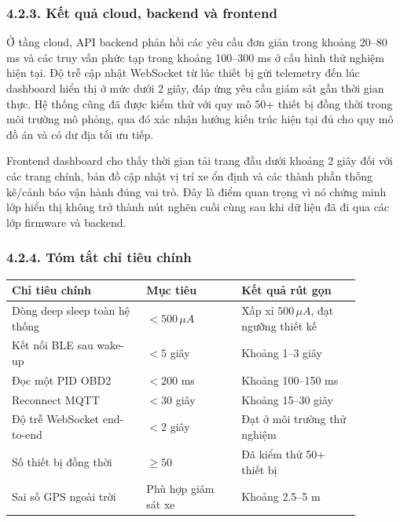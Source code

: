 \documentclass[a4paper]{extarticle}
\begin{document}
\subsubsection{4.2.3. Kết quả cloud, backend và frontend}

Ở tầng cloud, API backend phản hồi các yêu cầu đơn giản trong khoảng 20--80 ms và các truy vấn phức tạp trong khoảng 100--300 ms ở cấu hình thử nghiệm hiện tại. Độ trễ cập nhật WebSocket từ lúc thiết bị gửi telemetry đến lúc dashboard hiển thị ở mức dưới 2 giây, đáp ứng yêu cầu giám sát gần thời gian thực. Hệ thống cũng đã được kiểm thử với quy mô 50+ thiết bị đồng thời trong môi trường mô phỏng, qua đó xác nhận hướng kiến trúc hiện tại đủ cho quy mô đồ án và có dư địa tối ưu tiếp.

Frontend dashboard cho thấy thời gian tải trang đầu dưới khoảng 2 giây đối với các trang chính, bản đồ cập nhật vị trí xe ổn định và các thành phần thống kê/cảnh báo vận hành đúng vai trò. Đây là điểm quan trọng vì nó chứng minh lớp hiển thị không trở thành nút nghẽn cuối cùng sau khi dữ liệu đã đi qua các lớp firmware và backend.

\subsubsection{4.2.4. Tóm tắt chỉ tiêu chính}

\begin{center}
\begin{tabular}{|p{0.34\linewidth}|p{0.24\linewidth}|p{0.30\linewidth}|}
\hline
\textbf{Chỉ tiêu chính} & \textbf{Mục tiêu} & \textbf{Kết quả rút gọn} \\
\hline
Dòng deep sleep toàn hệ thống & \(< 500\,\mu A\) & Xấp xỉ \(500\,\mu A\), đạt ngưỡng thiết kế \\
\hline
Kết nối BLE sau wake-up & \(< 5\) giây & Khoảng 1--3 giây \\
\hline
Đọc một PID OBD2 & \(< 200\) ms & Khoảng 100--150 ms \\
\hline
Reconnect MQTT & \(< 30\) giây & Khoảng 15--30 giây \\
\hline
Độ trễ WebSocket end-to-end & \(< 2\) giây & Đạt ở môi trường thử nghiệm \\
\hline
Số thiết bị đồng thời & \(\ge 50\) & Đã kiểm thử 50+ thiết bị \\
\hline
Sai số GPS ngoài trời & Phù hợp giám sát xe & Khoảng 2.5--5 m \\
\hline
\end{tabular}
\end{center}
\end{document}

